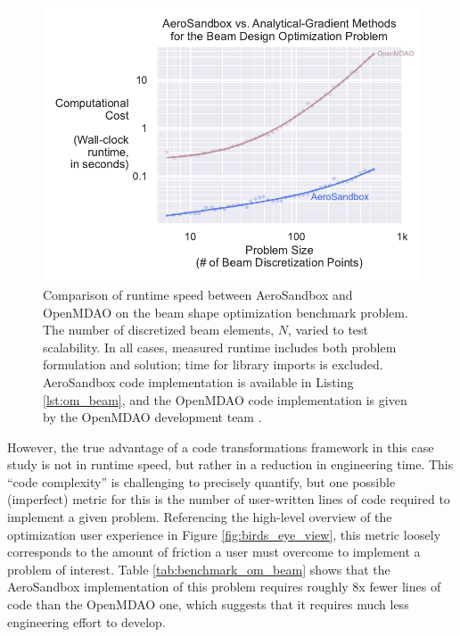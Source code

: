 \begin{figure}[H]
    \centering
    \includegraphics[width=\textwidth]{../figures/benchmark_om_beam.pdf}
    \caption{Comparison of runtime speed between AeroSandbox and OpenMDAO on the beam shape optimization benchmark problem. The number of discretized beam elements, $N$, varied to test scalability. In all cases, measured runtime includes both problem formulation and solution; time for library imports is excluded. AeroSandbox code implementation is available in Listing \ref{lst:om_beam}, and the OpenMDAO code implementation is given by the OpenMDAO development team \cite{om_beam}.}
    \label{fig:benchmark_om_beam}
\end{figure}

However, the true advantage of a code transformations framework in this case study is not in runtime speed, but rather in a reduction in engineering time. This ``code complexity'' is challenging to precisely quantify, but one possible (imperfect) metric for this is the number of user-written lines of code required to implement a given problem. Referencing the high-level overview of the optimization user experience in Figure \ref{fig:birds_eye_view}, this metric loosely corresponds to the amount of friction a user must overcome to implement a problem of interest. Table \ref{tab:benchmark_om_beam} shows that the AeroSandbox implementation of this problem requires roughly 8x fewer lines of code than the OpenMDAO one, which suggests that it requires much less engineering effort to develop.

